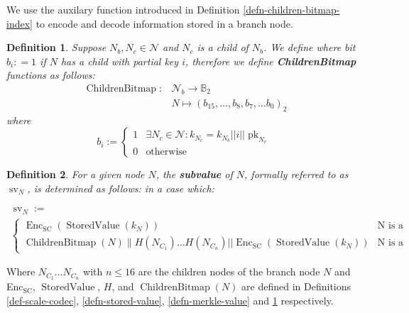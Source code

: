 \documentclass{article}
\newcommand{\assign}{:=}
\newcommand{\nobracket}{}
\newcommand{\tmop}[1]{\ensuremath{\operatorname{#1}}}
\newcommand{\tmrsub}[1]{\ensuremath{_{\textrm{#1}}}}
\newcommand{\tmstrong}[1]{\textbf{#1}}
\newcommand{\tmtextbf}[1]{{\bfseries{#1}}}
\newtheorem{definition}{Definition}
\providecommand{\nobracket}{}
\providecommand{\tmop}[1]{\ensuremath{\mathrm{#1}}}
\providecommand{\tmrsub}[1]{\tmrsub{\ensuremath{\mathrm{#1}}}}
\providecommand{\tmstrong}[1]{\tmtextbf{#1}}
\providecommand{\tmtextbf}[1]{\tmtextbf{#1}}
\newtheorem{definition}{Definition}
\begin{document}
We use the auxilary function introduced in Definition
\ref{defn-children-bitmap-index} to encode and decode information stored in a
branch node.

\begin{definition}
  \label{defn-children-bitmap}Suppose $N_b, N_c \in \mathcal{N}$ and $N_c$ is
  a child of $N_b$. We define where bit $b_i : = 1$ if $N$ has a child with
  partial key $i$, therefore we define {\tmstrong{ChildrenBitmap}} functions
  as follows:
  \[ \begin{array}{cc}
       \tmop{ChildrenBitmap} : & \mathcal{N}_b \rightarrow \mathbb{B}_2\\
       & N \mapsto (b_{15}, \ldots, b_8, b_7, \ldots b_0)_2
     \end{array} \]
  where
  \[ b_i \assign \left\{ \begin{array}{cc}
       1 & \exists N_c \in \mathcal{N}: k_{N_c} = k_{N_b} | | i | |
       \tmop{pk}_{N_c}\\
       0 & \text{otherwise}
     \end{array} \right. \]
\end{definition}

\begin{definition}
  \label{defn-node-subvalue}For a given node $N$, the {\tmstrong{subvalue}} of
  $N$, formally referred to as $\tmop{sv}_N$, is determined as follows: in a
  case which:
  \begin{itemize}
    \[ \begin{array}{l}
         \tmop{sv}_N \assign\\
         \left\{ \begin{array}{cc}
           \tmop{Enc}_{\tmop{SC}} (\tmop{StoredValue} (k_N)) & \text{N is a
           leaf node}\\
           \nobracket \tmop{ChildrenBitmap} (N)\|H (N_{C_1}) \ldots H
           (N_{C_n}) | | \tmop{Enc}_{\tmop{SC}} (\tmop{StoredValue} (k_N))  &
           \text{N is a branch node}
         \end{array} \right.
       \end{array} \]
  \end{itemize}
\end{definition}

Where $N_{C_1} \ldots N_{C_n}$ with $n \leqslant 16$ are the children nodes of
the branch node $N$ and Enc\tmrsub{SC}, $\tmop{StoredValue}$, $H$, and
$\tmop{ChildrenBitmap} (N)$ are defined in Definitions \ref{def-scale-codec},
\ref{defn-stored-value}, \ref{defn-merkle-value} and
\ref{defn-children-bitmap} respectively.
\end{document}

